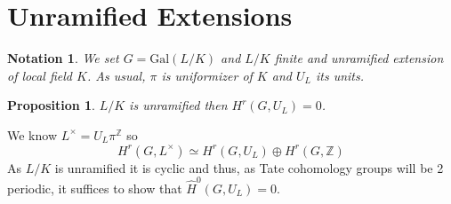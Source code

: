 \documentclass[twoside, 12pt]{iiser-thesis}
\newtheorem{prop}[thm]{ Proposition}
\newtheorem{notation}{ Notation}[section]
\newcommand{\Z}{\mathbb{Z}}
\begin{document}
\section{Unramified Extensions}\label{sec1}
\begin{notation} 
We set $G= \text{Gal} (L/K)$ and $L/K$ finite and unramified extension of local field $K$. As usual, $\pi$ is uniformizer of $K$ and $U_L$ its units.
    
\end{notation} 
\begin{prop}
$L/K$ is unramified then $H^r(G,U_L)=0$.
\end{prop}
We know $ L^\times =U_L \pi ^ \mathbb  Z$ so $$H^r(G, L^\times ) \simeq H^r(G, U_L) \oplus H^r(G, \Z)$$
As $L/K$ is unramified it is cyclic and thus, as Tate cohomology groups will be 2 periodic, it suffices to show that $\hat H ^0 (G, U_L) =0$.
\end{document}
